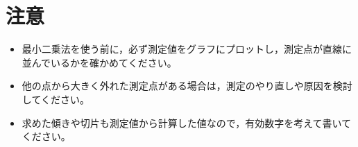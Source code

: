 \section{注意}

\begin{itemize}
  \item 最小二乗法を使う前に，必ず測定値をグラフにプロットし，測定点が直線に並んでいるかを確かめてください。
  \item 他の点から大きく外れた測定点がある場合は，測定のやり直しや原因を検討してください。
  \item 求めた傾きや切片も測定値から計算した値なので，有効数字を考えて書いてください。
\end{itemize}

